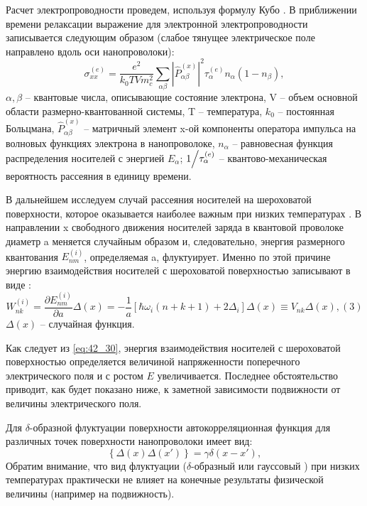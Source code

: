 Расчет электропроводности проведем, используя формулу Кубо \cite{Kubo1957a}. В приближении времени релаксации \cite{Khamidullin2002} выражение для электронной электропроводности записывается следующим образом (слабое тянущее электрическое поле направлено вдоль оси нанопроволоки):
\begin{equation} \label{eq:42_20}
\sigma _{xx}^{(e)} =\frac{e^{2} }{k_{0} TVm_{c}^{2} } \sum _{\alpha \beta }\left|\hat{P}_{\alpha \beta }^{(x)} \right|^{2} \tau _{\alpha }^{(e)} n_{\alpha } \left(1-n_{\beta } \right),
\end{equation} 
$\alpha ,\beta $ -- квантовые числа, описывающие состояние электрона, V -- объем основной области размерно-квантованной системы, T -- температура, $k_{0} $ -- постоянная Больцмана, $\hat{P}_{\alpha \beta }^{(x)} $ -- матричный элемент x-ой компоненты оператора импульса на волновых функциях электрона в нанопроволоке, $n_{\alpha } $ -- равновесная функция распределения носителей с энергией $E_{\alpha } $; ${1 \mathord{\left/{\vphantom{1 \tau _{\alpha }^{(e)} }}\right.\kern-\nulldelimiterspace} \tau _{\alpha }^{(e)} } $ -- квантово-механическая вероятность рассеяния в единицу времени.

В дальнейшем исследуем случай рассеяния носителей на шероховатой поверхности, которое оказывается наиболее важным при низких температурах \cite{Sakaki1987,Vurgaftman1999}. В направлении x свободного движения носителей заряда в квантовой проволоке диаметр a меняется случайным образом и, следовательно, энергия размерного квантования $E_{nm}^{(i)} $, определяемая a, флуктуирует. Именно по этой причине энергию взаимодействия носителей с шероховатой поверхностью записывают в виде \cite{Sakaki1987}:
\begin{equation} \label{eq:42_30}
W_{nk}^{(i)} =\frac{\partial E_{nm}^{(i)} }{\partial a} \Delta (x)=-\frac{1}{a} \left[\hbar \omega _{i} \left(n+k+1\right)+2\Delta _{i} \right]\Delta (x)\equiv V_{nk} \Delta (x),  (3)
\end{equation}  
$\Delta (x)$ -- случайная функция.

Как следует из \eqref{eq:42_30}, энергия взаимодействия носителей с шероховатой поверхностью определяется величиной напряженности поперечного электрического поля и с ростом $E$ увеличивается. Последнее обстоятельство приводит, как будет показано ниже, к заметной зависимости подвижности от величины электрического поля.

Для $\delta $-образной флуктуации поверхности автокорреляционная функция для различных точек поверхности нанопроволоки имеет вид:
\begin{equation} \label{eq:42_40}
\left\{\Delta (x)\Delta (x')\right\}=\gamma \delta (x-x'),
\end{equation} 
Обратим внимание, что вид флуктуации ($\delta $-образный или гауссовый \cite{Sakaki1987}) при низких температурах практически не влияет на конечные результаты физической величины (например на подвижность).

